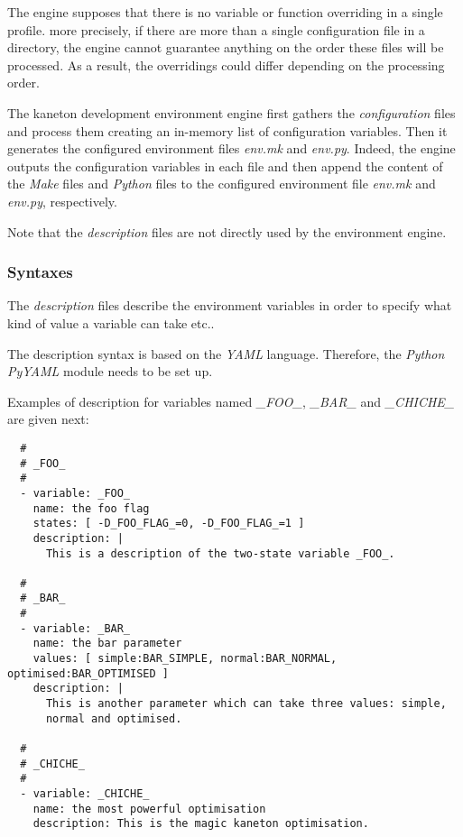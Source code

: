 The engine supposes that there is no variable or function overriding in
a single profile. more precisely, if there are more than a single
configuration file in a directory, the engine cannot guarantee anything
on the order these files will be processed. As a result, the overridings
could differ depending on the processing order.

The kaneton development environment engine first gathers the
\textit{configuration} files and process them creating an in-memory list of
configuration variables. Then it generates the configured environment files
\textit{env.mk} and \textit{env.py}. Indeed, the engine outputs the
configuration variables in each file and then append the content of the
\textit{Make} files and \textit{Python} files to the configured environment
file \textit{env.mk} and \textit{env.py}, respectively.

Note that the \textit{description} files are not directly used by the
environment engine.

%
%

\subsubsection{Syntaxes}



The \textit{description} files describe the environment variables in order
to specify what kind of value a variable can take etc..

The description syntax is based on the \textit{YAML} language. Therefore,
the \textit{Python} \textit{PyYAML} module needs to be set up.

Examples of description for variables named \textit{\_FOO\_}, \textit{\_BAR\_}
and \textit{\_CHICHE\_} are given next:

\begin{verbatim}
  #
  # _FOO_
  #
  - variable: _FOO_
    name: the foo flag
    states: [ -D_FOO_FLAG_=0, -D_FOO_FLAG_=1 ]
    description: |
      This is a description of the two-state variable _FOO_.

  #
  # _BAR_
  #
  - variable: _BAR_
    name: the bar parameter
    values: [ simple:BAR_SIMPLE, normal:BAR_NORMAL, optimised:BAR_OPTIMISED ]
    description: |
      This is another parameter which can take three values: simple,
      normal and optimised.

  #
  # _CHICHE_
  #
  - variable: _CHICHE_
    name: the most powerful optimisation
    description: This is the magic kaneton optimisation.
\end{verbatim}

